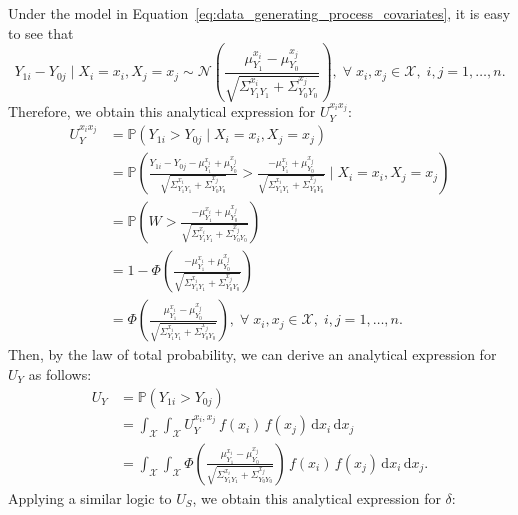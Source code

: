 \documentclass[referee,usenatbib]{biom}
\newcommand{\Prob}{\mathbb{P}}
\begin{document}
Under the model in Equation~\eqref{eq:data_generating_process_covariates}, it is easy to see that
\begin{equation*}
    Y_{1i} - Y_{0j} \mid X_{i} = x_{i}, X_{j} = x_{j} \sim \mathcal{N} \left( \frac{\mu^{x_{i}}_{Y_{1}} - \mu^{x_{j}}_{Y_{0}}}{\sqrt{\Sigma^{x_{i}}_{Y_{1} Y_{1}} + \Sigma^{x_{j}}_{Y_{0} Y_{0}}}} \right), \; \forall \; x_{i}, x_{j} \in \mathcal{X}, \; i,j = 1, \ldots, n.
\end{equation*}
Therefore, we obtain this analytical expression for \(U^{x_{i} x_{j}}_{Y}\):
\begin{align*}
        U^{x_{i} x_{j}}_{Y} & = \Prob \left( Y_{1i} > Y_{0j} \mid X_{i} = x_{i}, X_{j} = x_{j} \right) \\
        & = \Prob \left( \frac{Y_{1i} - Y_{0j} - \mu^{x_{i}}_{Y_{1}} + \mu^{x_{j}}_{Y_{0}}}{\sqrt{\Sigma^{x_{i}}_{Y_{1} Y_{1}} + \Sigma^{x_{j}}_{Y_{0} Y_{0}}}} > \frac{- \mu^{x_{i}}_{Y_{1}} + \mu^{x_{j}}_{Y_{0}}}{\sqrt{\Sigma^{x_{i}}_{Y_{1} Y_{1}} + \Sigma^{x_{j}}_{Y_{0} Y_{0}}}} \mid X_{i} = x_{i}, X_{j} = x_{j} \right) \\
        & = \Prob \left( W > \frac{- \mu^{x_{i}}_{Y_{1}} + \mu^{x_{j}}_{Y_{0}}}{\sqrt{\Sigma^{x_{i}}_{Y_{1} Y_{1}} + \Sigma^{x_{j}}_{Y_{0} Y_{0}}}} \right) \\
        & = 1 - \Phi \left( \frac{- \mu^{x_{i}}_{Y_{1}} + \mu^{x_{j}}_{Y_{0}}}{\sqrt{\Sigma^{x_{i}}_{Y_{1} Y_{1}} + \Sigma^{x_{j}}_{Y_{0} Y_{0}}}} \right) \\
        & = \Phi \left( \frac{\mu^{x_{i}}_{Y_{1}} - \mu^{x_{j}}_{Y_{0}}}{\sqrt{\Sigma^{x_{i}}_{Y_{1} Y_{1}} + \Sigma^{x_{j}}_{Y_{0} Y_{0}}}} \right), \; \forall \; x_{i}, x_{j} \in \mathcal{X}, \; i,j = 1, \ldots, n.
\end{align*}
Then, by the law of total probability, we can derive an analytical expression for \(U_{Y}\) as follows:
\begin{align*}
        U_{Y} & = \Prob \left( Y_{1i} > Y_{0j} \right) \\
        & = \int_{\mathcal{X}} \int_{\mathcal{X}} U^{x_{i}, x_{j}}_{Y} \, f (x_{i}) \, f (x_{j}) \, \text{d}x_{i} \, \text{d}x_{j} \\
        & = \int_{\mathcal{X}} \int_{\mathcal{X}} \Phi \left( \frac{\mu^{x_{i}}_{Y_{1}} - \mu^{x_{j}}_{Y_{0}}}{\sqrt{\Sigma^{x_{i}}_{Y_{1} Y_{1}} + \Sigma^{x_{j}}_{Y_{0} Y_{0}}}} \right) \, f (x_{i}) \, f (x_{j}) \, \text{d}x_{i} \, \text{d}x_{j}.
\end{align*}
Applying a similar logic to \(U_{S}\), we obtain this analytical expression for \(\delta\):
\end{document}
